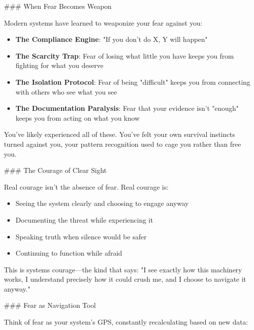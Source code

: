 \documentclass[12pt]{book}
\begin{document}
\#\#\# When Fear Becomes Weapon

Modern systems have learned to weaponize your fear against you:

\begin{itemize}
\item \textbf{The Compliance Engine}: "If you don't do X, Y will happen"
\item \textbf{The Scarcity Trap}: Fear of losing what little you have keeps you from fighting for what you deserve
\item \textbf{The Isolation Protocol}: Fear of being "difficult" keeps you from connecting with others who see what you see
\item \textbf{The Documentation Paralysis}: Fear that your evidence isn't "enough" keeps you from acting on what you know

\end{itemize}
You've likely experienced all of these. You've felt your own survival instincts turned against you, your pattern recognition used to cage you rather than free you.

\#\#\# The Courage of Clear Sight

Real courage isn't the absence of fear. Real courage is:

\begin{itemize}
\item Seeing the system clearly and choosing to engage anyway
\item Documenting the threat while experiencing it
\item Speaking truth when silence would be safer
\item Continuing to function while afraid

\end{itemize}
This is systems courage—the kind that says: "I see exactly how this machinery works, I understand precisely how it could crush me, and I choose to navigate it anyway."

\#\#\# Fear as Navigation Tool

Think of fear as your system's GPS, constantly recalculating based on new data:
\end{document}
